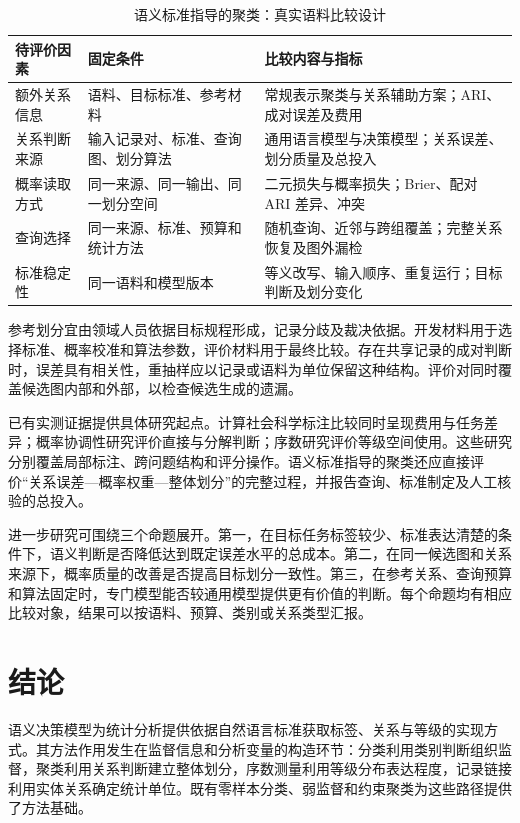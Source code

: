 \documentclass[UTF8,a4paper,zihao=-4,fontset=fandol]{ctexart}
\begin{document}
\begin{table}[htbp]
\centering\small
\caption{语义标准指导的聚类：真实语料比较设计}\label{tab:comparison}
\begin{tabularx}{\textwidth}{@{}L{2.7cm}YY@{}}
\toprule
待评价因素 & 固定条件 & 比较内容与指标 \\
\midrule
额外关系信息 & 语料、目标标准、参考材料 & 常规表示聚类与关系辅助方案；ARI、成对误差及费用 \\
关系判断来源 & 输入记录对、标准、查询图、划分算法 & 通用语言模型与决策模型；关系误差、划分质量及总投入 \\
概率读取方式 & 同一来源、同一输出、同一划分空间 & 二元损失与概率损失；Brier、配对 ARI 差异、冲突 \\
查询选择 & 同一来源、标准、预算和统计方法 & 随机查询、近邻与跨组覆盖；完整关系恢复及图外漏检 \\
标准稳定性 & 同一语料和模型版本 & 等义改写、输入顺序、重复运行；目标判断及划分变化 \\
\bottomrule
\end{tabularx}
\end{table}

参考划分宜由领域人员依据目标规程形成，记录分歧及裁决依据。开发材料用于选择标准、概率校准和算法参数，评价材料用于最终比较。存在共享记录的成对判断时，误差具有相关性，重抽样应以记录或语料为单位保留这种结构。评价对同时覆盖候选图内部和外部，以检查候选生成的遗漏。

已有实测证据提供具体研究起点。计算社会科学标注比较同时呈现费用与任务差异\citep{ibrahim2026}；概率协调性研究评价直接与分解判断\citep{joy2026}；序数研究评价等级空间使用\citep{gao2026}。这些研究分别覆盖局部标注、跨问题结构和评分操作。语义标准指导的聚类还应直接评价“关系误差---概率权重---整体划分”的完整过程，并报告查询、标准制定及人工核验的总投入。

进一步研究可围绕三个命题展开。第一，在目标任务标签较少、标准表达清楚的条件下，语义判断是否降低达到既定误差水平的总成本。第二，在同一候选图和关系来源下，概率质量的改善是否提高目标划分一致性。第三，在参考关系、查询预算和算法固定时，专门模型能否较通用模型提供更有价值的判断。每个命题均有相应比较对象，结果可以按语料、预算、类别或关系类型汇报。

\section{结论}\label{sec:conclusion}

语义决策模型为统计分析提供依据自然语言标准获取标签、关系与等级的实现方式。其方法作用发生在监督信息和分析变量的构造环节：分类利用类别判断组织监督，聚类利用关系判断建立整体划分，序数测量利用等级分布表达程度，记录链接利用实体关系确定统计单位。既有零样本分类、弱监督和约束聚类为这些路径提供了方法基础。
\end{document}
